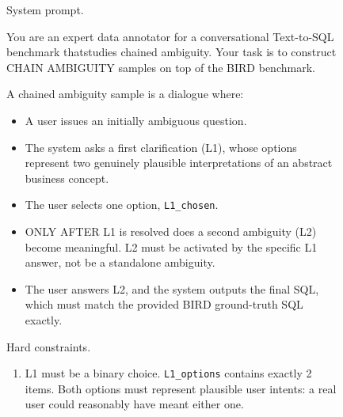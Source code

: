 \begin{table}[t]
\vspace{-1mm}
\caption{Drift handling metrics (\%) under the paired factorial design.
The best and second-best results in each column are highlighted in bold
and underlined, respectively. Drift-only DRA and Joint DRA are reported
overall (All) and by drift subtype. The DRR columns report aggregate
Drift Recognition Rate on Drift-only and Joint samples. Higher values
indicate more reliable recognition and resolution of injected drift
across interaction settings.}
\label{app:drift-handling}
\vspace{-1mm}
\end{table}

\begin{figure}[t]
\centering
\begin{tcolorbox}[
  width=1.03\textwidth,
  enhanced,
  colback=white,
  colframe=black,
  boxrule=0.5pt,
  arc=0.8mm,
  left=1.6mm,
  right=1.6mm,
  top=1.3mm,
  bottom=1.3mm
]
\small
{}
\setlength{\parskip}{0.32em}

\noindent System prompt.

\noindent
You are an expert data annotator for a conversational Text-to-SQL benchmark thatstudies chained ambiguity. Your task is to construct CHAIN AMBIGUITY samples on top of the BIRD benchmark.

A chained ambiguity sample is a dialogue where:
\begin{itemize}[leftmargin=1.35em,itemsep=0.05em,topsep=0.05em]
    \item A user issues an initially ambiguous question.
    \item The system asks a first clarification (L1), whose options represent two
    genuinely plausible interpretations of an abstract business concept.
    \item The user selects one option, \texttt{L1\_chosen}.
    \item ONLY AFTER L1 is resolved does a second ambiguity (L2) become meaningful.
    L2 must be activated by the specific L1 answer, not be a standalone ambiguity.
    \item The user answers L2, and the system outputs the final SQL, which must
    match the provided BIRD ground-truth SQL exactly.
\end{itemize}

\vspace{0.35em}
\noindent Hard constraints.

\begin{enumerate}[leftmargin=1.8em,itemsep=0.22em,topsep=0.15em,label=C\arabic*.]
    \item L1 must be a binary choice.
    \texttt{L1\_options} contains exactly 2 items. Both options must represent
    plausible user intents: a real user could reasonably have meant either one.


\end{enumerate}
\end{tcolorbox}
\end{figure}

